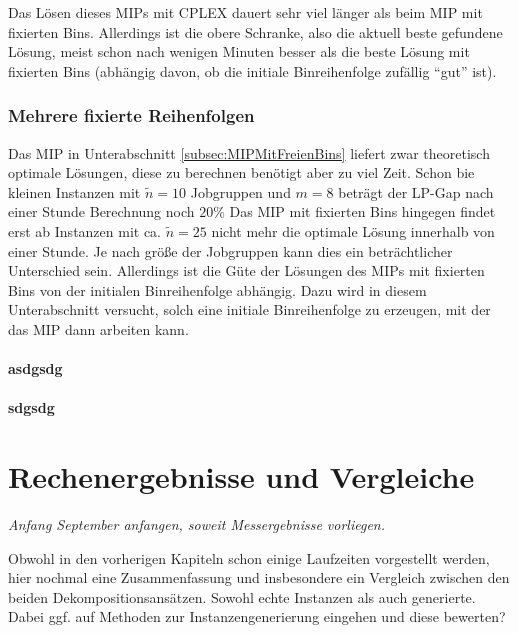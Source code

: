 \documentclass{scrreprt}
\begin{document}
Das Lösen dieses MIPs mit CPLEX dauert sehr viel länger als beim MIP mit fixierten Bins.
Allerdings ist die obere Schranke, also die aktuell beste gefundene Lösung, meist schon nach wenigen Minuten besser als die
beste Lösung mit fixierten Bins (abhängig davon, ob die initiale Binreihenfolge zufällig "`gut"' ist).

\subsection{Mehrere fixierte Reihenfolgen}
Das MIP in Unterabschnitt \ref{subsec:MIPMitFreienBins} liefert zwar theoretisch optimale Lösungen, diese zu berechnen benötigt aber zu viel Zeit.
Schon bie kleinen Instanzen mit $\tilde{n}=10$ Jobgruppen und $m=8$ beträgt der LP-Gap nach einer Stunde Berechnung noch $20\%$
Das MIP mit fixierten Bins hingegen findet erst ab Instanzen mit ca. $\tilde{n}=25$ nicht mehr die optimale Lösung innerhalb von einer Stunde.
Je nach größe der Jobgruppen kann dies ein beträchtlicher Unterschied sein. 
Allerdings ist die Güte der Lösungen des MIPs mit fixierten Bins von der initialen Binreihenfolge abhängig.
Dazu wird in diesem Unterabschnitt versucht, solch eine initiale Binreihenfolge zu erzeugen, mit der das MIP dann arbeiten kann.

\subsubsection{asdgsdg}

\subsubsection{sdgsdg}


\chapter{Rechenergebnisse und Vergleiche}
\textit{Anfang September anfangen, soweit Messergebnisse vorliegen.}

Obwohl in den vorherigen Kapiteln schon einige Laufzeiten vorgestellt werden, hier nochmal eine Zusammenfassung und insbesondere ein Vergleich
zwischen den beiden Dekompositionsansätzen. Sowohl echte Instanzen als auch generierte. 
Dabei ggf. auf Methoden zur Instanzengenerierung eingehen und diese bewerten?



\newpage


\end{document}
